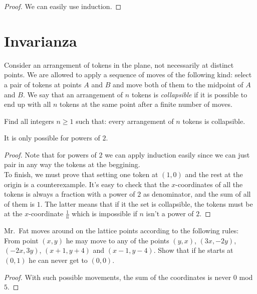 \begin{proof}
  We can easily use induction.
\end{proof}

\section{Invarianza}

\begin{sproblem}
  Consider an arrangement of tokens in the plane,
  not necessarily at distinct points.
  We are allowed to apply a sequence of moves of the following kind:
  select a pair of tokens at points $A$ and $B$ and move
  both of them to the midpoint of $A$ and $B$.
  We say that an arrangement of $n$ tokens is \emph{collapsible} if it is
  possible to end up with all $n$ tokens at the same point after a finite
  number of moves.

  Find all integers $n \ge 1$ such that:
  every arrangement of $n$ tokens is collapsible.
\end{sproblem}

\begin{claim}
  It is only possible for powers of $2$.
\end{claim}

\begin{proof}
    Note that for powers of $2$ we can apply induction easily since 
    we can just pair in any way the tokens at the beggining. \\
    To finish, we must prove that setting one token at $(1, 0)$ 
    and the rest at the origin is a counterexample. 
    It's easy to check that the $x$-coordinates 
    of all the tokens is always 
    a fraction with a power of $2$ as denominator, 
    and the sum of all of them is $1$. 
    The latter means that if it the set is collapsible, 
    the tokens must be at the $x$-coordinate $\frac 1n$ 
    which is impossible if $n$ isn't a power of $2$.
\end{proof}

\begin{problem}
  Mr.\ Fat moves around on the lattice points
  according to the following rules:
  From point $(x,y)$ he may move to any of the points
  $(y,x)$, $(3x,-2y)$, $(-2x,3y)$, $(x+1,y+4)$ and $(x-1,y-4)$.
  Show that if he starts at $(0,1)$ he can never get to $(0,0)$.
\end{problem}

\begin{proof}
  With such possible movements, the sum of the coordinates is 
  never $0$ mod $5$.
\end{proof}

